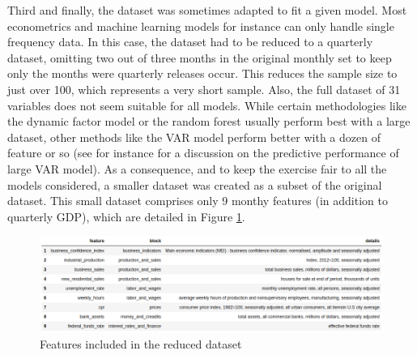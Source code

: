 Third and finally, the dataset was sometimes adapted to fit a given model. Most econometrics and machine learning models for instance can only handle single frequency data. In this case, the dataset had to be reduced to a quarterly dataset, omitting two out of three months in the original monthly set to keep only the months were quarterly releases occur. This reduces the sample size to just over 100, which represents a very short sample. Also, the full dataset of 31 variables does not seem suitable for all models. While certain methodologies like the dynamic factor model or the random forest usually perform best with a large dataset, other methods like the VAR model perform better with a dozen of feature or so (see for instance \cite{Giannone2015} for a discussion on the predictive performance of large VAR model). As a consequence, and to keep the exercise fair to all the models considered, a smaller dataset was created as a subset of the original dataset. This small dataset comprises only 9 monthy features (in addition to quarterly GDP), which are detailed in Figure \ref{fig_c2_s3_3}.

\begin{figure}[H]
\centering
\includegraphics[scale=0.63]{images/small_dataset_dataframe.png}
\caption{Features included in the reduced dataset}
\label{fig_c2_s3_3}
\end{figure}





















